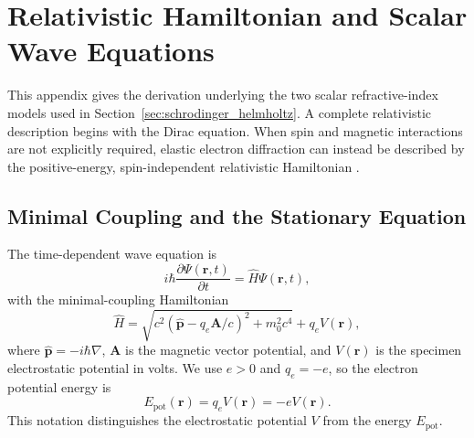 
\section{Relativistic Hamiltonian and Scalar Wave Equations}
\label{app:relativistic_hamiltonian}

This appendix gives the derivation underlying the two scalar refractive-index
models used in Section~\ref{sec:schrodinger_helmholtz}. A complete relativistic
description begins with the Dirac equation. When spin and magnetic interactions
are not explicitly required, elastic electron diffraction can instead be
described by the positive-energy, spin-independent relativistic Hamiltonian
\cite{fujiwara1961relativistic,kirkland2010advanced}.

\subsection{Minimal Coupling and the Stationary Equation}

The time-dependent wave equation is
\begin{equation}
i\hbar\frac{\partial\Psi(\mathbf r,t)}{\partial t}
=
\hat H\Psi(\mathbf r,t),
\label{eq:app_time_dependent_wave_equation}
\end{equation}
with the minimal-coupling Hamiltonian
\begin{equation}
\hat H
=
\sqrt{
c^2\left(\hat{\mathbf p}-q_e\mathbf A/c\right)^2+m_0^2c^4
}
+
q_eV(\mathbf r),
\label{eq:app_minimal_coupling_hamiltonian}
\end{equation}
where $\hat{\mathbf p}=-i\hbar\nabla$, $\mathbf A$ is the magnetic vector
potential, and $V(\mathbf r)$ is the specimen electrostatic potential in
volts. We use $e>0$ and $q_e=-e$, so the electron potential energy is
\begin{equation}
E_{\mathrm{pot}}(\mathbf r)
=
q_eV(\mathbf r)
=
-eV(\mathbf r).
\label{eq:app_electron_potential_energy}
\end{equation}
This notation distinguishes the electrostatic potential $V$ from the energy
$E_{\mathrm{pot}}$.

